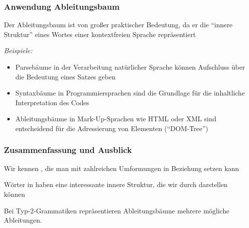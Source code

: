 \documentclass[aspectratio=1610,onlymath]{beamer}
\begin{document}
\begin{frame}\frametitle{Anwendung Ableitungsbaum}

Der Ableitungsbaum ist von großer praktischer Bedeutung, 
da er die \alert{"`innere Struktur"'} eines Wortes einer kontextfreien Sprache
repräsentiert
\bigskip

{}%
\bigskip

\emph{Beispiele:}
\begin{itemize}
\item Parsebäume in der \alert{Verarbeitung natürlicher Sprache} können Aufschluss über die Bedeutung eines Satzes geben
\item Syntaxbäume in \alert{Programmiersprachen} sind die Grundlage für die inhaltliche Interpretation des Codes
\item Ableitungsbäume in \alert{Mark-Up-Sprachen} wie HTML oder XML sind entscheidend für die Adressierung von Elementen ("`DOM-Tree"')
\end{itemize}

\end{frame}

\begin{frame}\frametitle{Zusammenfassung und Ausblick}

Wir kennen , die man mit zahlreichen Umformungen in Beziehung setzen kann\bigskip


Wörter in  haben eine interessante innere Struktur, die wir durch  darstellen können\bigskip

Bei Typ-2-Grammatiken repräsentieren Ableitungsbäume mehrere mögliche Ableitungen.\bigskip


\end{frame}
\end{document}
